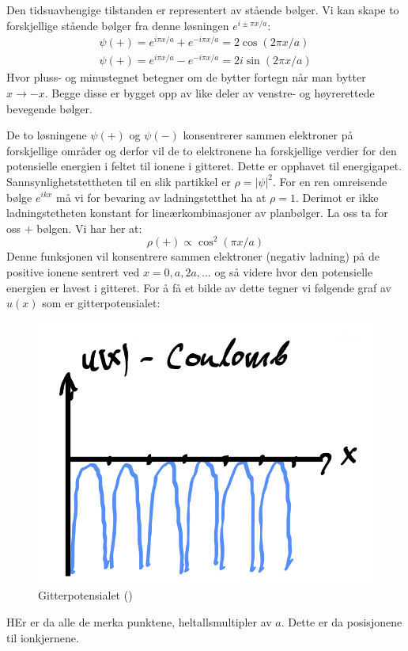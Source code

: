 \documentclass{article}
\begin{document}
Den tidsuavhengige tilstanden er representert av stående bølger. Vi kan skape to forskjellige stående bølger fra denne løsningen $e^{i \pm \pi x /a}$:
\begin{align}
    \psi(+) = e^{i \pi x / a} + e^{-i \pi x / a} = 2 \cos(2\pi x /a)\\
    \psi(+) = e^{i \pi x / a} - e^{-i \pi x / a} = 2i \sin(2\pi x /a)
\end{align}
Hvor pluss- og minustegnet betegner om de bytter fortegn når man bytter $x \rightarrow -x$. Begge disse er bygget opp av like deler av venstre- og høyrerettede bevegende bølger.

De to løsningene $\psi(+)$ og $\psi(-)$ konsentrerer sammen elektroner på forskjellige områder og derfor vil de to elektronene ha forskjellige verdier for den potensielle energien i feltet til ionene i gitteret. Dette er opphavet til energigapet. Sannsynlighetstettheten til en slik partikkel er $\rho = |\psi|^2$. For en ren omreisende bølge $e^{ikx}$ må vi for bevaring av ladningstetthet ha at $\rho = 1$. Derimot er ikke ladningstetheten konstant for lineærkombinasjoner av planbølger. La oss ta for oss $+$ bølgen. Vi har her at:
\begin{equation}
    \rho(+) \propto \cos^2(\pi x / a)
\end{equation}
Denne funksjonen vil konsentrere sammen elektroner (negativ ladning) på de positive ionene sentrert ved $x = 0, a, 2a, \dots$ og så videre hvor den potensielle energien er lavest i gitteret. For å få et bilde av dette tegner vi følgende graf av $u(x)$ som er gitterpotensialet:
\begin{figure}[H]
    \centering
    \includegraphics[width=0.5\linewidth]{bilder/gitterpotensialet_nestenfrimodell.png}
    \caption{Gitterpotensialet (\cite{Aleksander})}
    \label{fig:gitterpotensialet_nestenfrimodell}
\end{figure}
HEr er da alle de merka punktene, heltallsmultipler av $a$. Dette er da posisjonene til ionkjernene.
\end{document}
